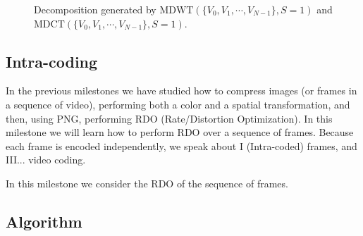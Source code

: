 \begin{figure}
  \centering
  \caption{Decomposition generated by $\text{MDWT}(\{V_0, V_1, \cdots, V_{N-1}\}, S=1)$ and $\text{MDCT}(\{V_0, V_1, \cdots, V_{N-1}\}, S=1)$.}
  \label{fig:MDWT}
\end{figure}

\subsection{Intra-coding}

In the previous milestones we have studied how to compress images (or
frames in a sequence of video), performing both a color and a spatial
transformation, and then, using PNG, performing RDO (Rate/Distortion
Optimization). In this milestone we will learn how to perform RDO over
a sequence of frames. Because each frame is encoded independently, we
speak about I (Intra-coded) frames, and III... video coding.

In this milestone we consider the RDO of the sequence of frames.

\subsection{Algorithm}

